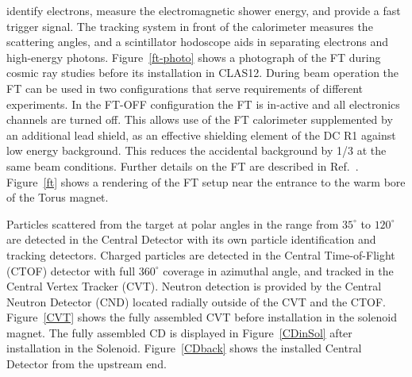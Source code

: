 \documentclass[final,3p,twocolumn]{elsarticle}
\begin{document}
identify electrons,  measure the electromagnetic shower energy, and provide a fast trigger signal. The tracking system
in front of the calorimeter  measures the scattering angles, and a scintillator hodoscope aids in separating electrons and
high-energy photons. Figure~\ref{ft-photo} shows a photograph of the FT during cosmic ray studies before its installation
in CLAS12. 
During beam operation the FT can be used in two configurations that serve requirements of different experiments. In the FT-OFF 
configuration the FT is in-active and all electronics channels are turned off. This allows use of the FT calorimeter supplemented by 
an additional lead shield, as an effective shielding element of the DC R1 against low energy background. This reduces the 
accidental background by 1/3 at the same beam conditions. Further details on the FT are described in Ref.~\cite{FT}. Figure~\ref{ft} shows a rendering of the FT setup near the entrance to the warm bore of the Torus magnet.   



Particles scattered from the target at polar angles in the range from $35^\circ$  to $120^\circ$ are detected in the
Central Detector with its own particle identification and tracking detectors. Charged particles are detected in the
Central Time-of-Flight (CTOF) detector with full $360^\circ$ coverage in azimuthal angle, and tracked in the Central
Vertex Tracker (CVT). Neutron detection is provided by the Central Neutron Detector (CND) located radially outside
of the CVT and the CTOF.  Figure~\ref{CVT} shows the fully assembled CVT before installation in the solenoid magnet.
The fully assembled CD is displayed in  Figure~\ref{CDinSol} after installation in the Solenoid.  Figure~\ref{CDback}
shows the installed Central Detector from the upstream end.
\end{document}
